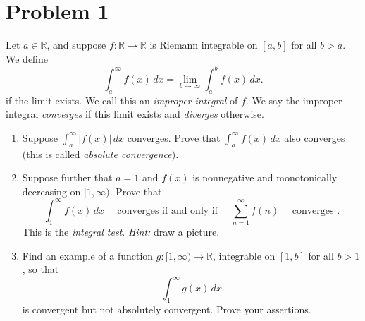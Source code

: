 \documentclass[11pt]{article}
\begin{document}
\pagebreak
\section{Problem 1}
    Let $a \in \mathbb{R}$, and suppose $f : \mathbb{R} \to \mathbb{R}$ is Riemann integrable on $[a, b]$ for all $b > a$. We define
    \begin{equation*}
        \int_{a}^{\infty} f(x)\,dx = \lim_{b \to \infty} \int_{a}^{b} f(x)\,dx.
    \end{equation*}
    if the limit exists. We call this an \textit{improper integral} of $f$. We say the improper integral \textit{converges} if this limit exists and \textit{diverges} otherwise. 
    \begin{enumerate}[label=(\alph*)]
        \item 
        Suppose $\int_{a}^{\infty} |f(x)|\,dx$ converges. Prove that $\int_{a}^{\infty} f(x)\,dx$ also converges (this is called \textit{absolute convergence}).
        
        \item 
        Suppose further that $a = 1$ and $f(x)$ is nonnegative and monotonically decreasing on $[1, \infty)$. Prove that
        \begin{equation*}
            \int_{1}^{\infty} f(x)\,dx \quad \text{ converges if and only if } \quad \sum_{n = 1}^{\infty} f(n) \quad \text{ converges }.
        \end{equation*}
        This is the \textit{integral test}. \textit{Hint:} draw a picture.

        \item 
        Find an example of a function $g : [1, \infty) \to \mathbb{R}$, integrable on $[1, b]$ for all $b > 1$, so that
        \begin{equation*}
            \int_{1}^{\infty} g(x)\,dx
        \end{equation*}
        is convergent but not absolutely convergent. Prove your assertions.
        
    \end{enumerate}
\end{document}

